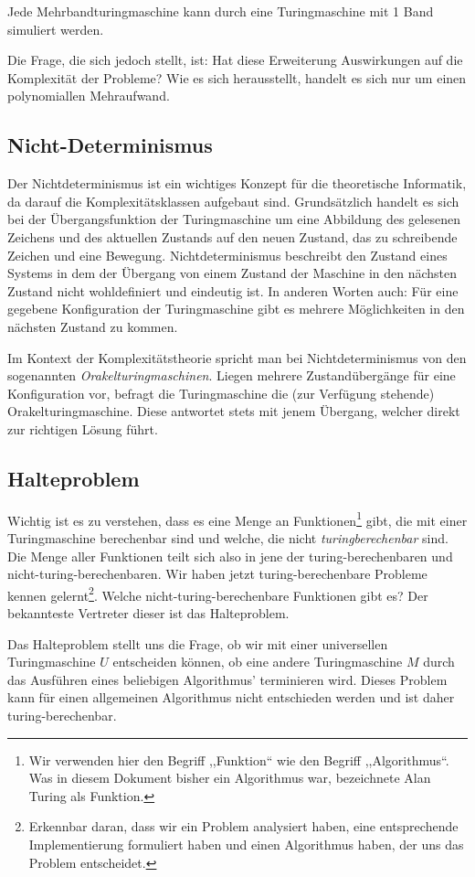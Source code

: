 Jede Mehrbandturingmaschine kann durch eine Turingmaschine mit 1 Band simuliert werden.

Die Frage, die sich jedoch stellt, ist: Hat diese Erweiterung Auswirkungen auf die Komplexität der Probleme? Wie es sich herausstellt, handelt es sich nur um einen polynomiallen Mehraufwand.
%
\subsection{Nicht-Determinismus}
\label{sec:nondeterminism}
%
Der Nichtdeterminismus ist ein wichtiges Konzept für die theoretische Informatik, da darauf die Komplexitätsklassen aufgebaut sind. Grundsätzlich handelt es sich bei der Übergangsfunktion der Turingmaschine um eine Abbildung des gelesenen Zeichens und des aktuellen Zustands auf den neuen Zustand, das zu schreibende Zeichen und eine Bewegung. Nichtdeterminismus beschreibt den Zustand eines Systems in dem der Übergang von einem Zustand der Maschine in den nächsten Zustand nicht wohldefiniert und eindeutig ist. In anderen Worten auch: Für eine gegebene Konfiguration der Turingmaschine gibt es mehrere Möglichkeiten in den nächsten Zustand zu kommen.

Im Kontext der Komplexitätstheorie spricht man bei Nichtdeterminismus von den sogenannten \emph{Orakelturingmaschinen}. Liegen mehrere Zustandübergänge für eine Konfiguration vor, befragt die Turingmaschine die (zur Verfügung stehende) Orakelturingmaschine. Diese antwortet stets mit jenem Übergang, welcher direkt zur richtigen Lösung führt.
%
\subsection{Halteproblem}
%
Wichtig ist es zu verstehen, dass es eine Menge an Funktionen\footnote{Wir verwenden hier den Begriff ,,Funktion`` wie den Begriff ,,Algorithmus``. Was in diesem Dokument bisher ein Algorithmus war, bezeichnete Alan Turing als Funktion.} gibt, die mit einer Turingmaschine berechenbar sind und welche, die nicht \emph{turingberechenbar} sind. Die Menge aller Funktionen teilt sich also in jene der turing-berechenbaren und nicht-turing-berechenbaren. Wir haben jetzt turing-berechenbare Probleme kennen gelernt\footnote{Erkennbar daran, dass wir ein Problem analysiert haben, eine entsprechende Implementierung formuliert haben und einen Algorithmus haben, der uns das Problem entscheidet.}. Welche nicht-turing-berechenbare Funktionen gibt es? Der bekannteste Vertreter dieser ist das Halteproblem.

Das Halteproblem stellt uns die Frage, ob wir mit einer universellen Turingmaschine $U$ entscheiden können, ob eine andere Turingmaschine $M$ durch das Ausführen eines beliebigen Algorithmus' terminieren wird. Dieses Problem kann für einen allgemeinen Algorithmus nicht entschieden werden und ist daher turing-berechenbar.

